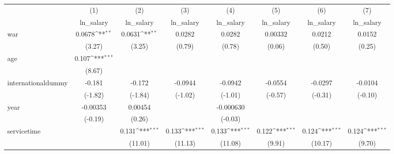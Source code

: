 {
\def\sym#1{\ifmmode^{#1}\else\(^{#1}\)\fi}
\begin{tabular}{l*{7}{c}}
\hline\hline
            &\multicolumn{1}{c}{(1)}&\multicolumn{1}{c}{(2)}&\multicolumn{1}{c}{(3)}&\multicolumn{1}{c}{(4)}&\multicolumn{1}{c}{(5)}&\multicolumn{1}{c}{(6)}&\multicolumn{1}{c}{(7)}\\
            &\multicolumn{1}{c}{ln\_salary}&\multicolumn{1}{c}{ln\_salary}&\multicolumn{1}{c}{ln\_salary}&\multicolumn{1}{c}{ln\_salary}&\multicolumn{1}{c}{ln\_salary}&\multicolumn{1}{c}{ln\_salary}&\multicolumn{1}{c}{ln\_salary}\\
\hline
war         &      0.0678\sym{**} &      0.0631\sym{**} &      0.0282         &      0.0282         &     0.00332         &      0.0212         &      0.0152         \\
            &      (3.27)         &      (3.25)         &      (0.79)         &      (0.78)         &      (0.06)         &      (0.50)         &      (0.25)         \\
[1em]
age         &       0.107\sym{***}&                     &                     &                     &                     &                     &                     \\
            &      (8.67)         &                     &                     &                     &                     &                     &                     \\
[1em]
internationaldummy&      -0.181         &      -0.172         &     -0.0944         &     -0.0942         &     -0.0554         &     -0.0297         &     -0.0104         \\
            &     (-1.82)         &     (-1.84)         &     (-1.02)         &     (-1.01)         &     (-0.57)         &     (-0.31)         &     (-0.10)         \\
[1em]
year        &    -0.00353         &     0.00454         &                     &   -0.000630         &                     &                     &                     \\
            &     (-0.19)         &      (0.26)         &                     &     (-0.03)         &                     &                     &                     \\
[1em]
servicetime &                     &       0.131\sym{***}&       0.133\sym{***}&       0.133\sym{***}&       0.122\sym{***}&       0.124\sym{***}&       0.124\sym{***}\\
            &                     &     (11.01)         &     (11.13)         &     (11.08)         &      (9.91)         &     (10.17)         &      (9.70)         \\

\end{tabular}}
